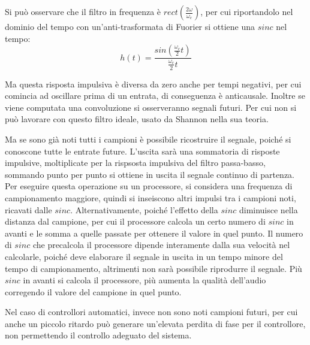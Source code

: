 \documentclass{article}
\numberwithin{equation}{subsection}
\begin{document}
Si può osservare che il filtro in frequenza è $rect\left(\displaystyle\frac{2\omega}{\omega_c}\right)$, per cui riportandolo nel dominio del tempo con un'anti-trasformata di Fuorier si ottiene una $sinc$ nel tempo: 
\begin{equation}
    h(t)=\displaystyle\frac{sin\left(\displaystyle\frac{\omega_c}{2}t\right)}{\displaystyle\frac{\omega_c}{2}t}
\end{equation}
\begin{center}
\end{center}

Ma questa risposta impulsiva è diversa da zero anche per tempi negativi, per cui comincia ad oscillare prima di un entrata, di conseguenza è anticausale. Inoltre 
se viene computata una convoluzione si osserveranno segnali futuri. Per cui non si può lavorare con questo filtro ideale, usato da Shannon nella sua teoria. 

Ma se sono già 
noti tutti i campioni è possibile ricostruire il segnale, poiché si conoscone tutte le entrate future. L'uscita sarà una sommatoria di risposte impulsive, moltiplicate per 
la rispsosta impulsiva del filtro passa-basso, sommando punto per punto si ottiene in uscita il segnale continuo di partenza. Per eseguire questa operazione su un 
processore, si considera una frequenza di campionamento maggiore, quindi si inseiscono altri impulsi tra i campioni noti, ricavati dalle $sinc$. Alternativamente, poiché 
l'effetto della $sinc$ diminuisce nella distanza dal campione, per cui il processore calcola un certo numero di $sinc$ in avanti e le somma a quelle passate per ottenere 
il valore in quel punto. Il numero di $sinc$ che precalcola il processore dipende interamente dalla sua velocità nel calcolarle, poiché deve elaborare il segnale in uscita 
in un tempo minore del tempo di campionamento, altrimenti non sarà possibile riprodurre il segnale. Più $sinc$ in avanti si calcola il 
processore, più aumenta la qualità dell'audio corregendo il valore del campione in quel punto. 

Nel caso di controllori automatici, invece non sono noti campioni futuri, per cui anche un piccolo ritardo può generare un'elevata perdita di fase per il controllore, 
non permettendo il controllo adeguato del sistema. 
\end{document}
